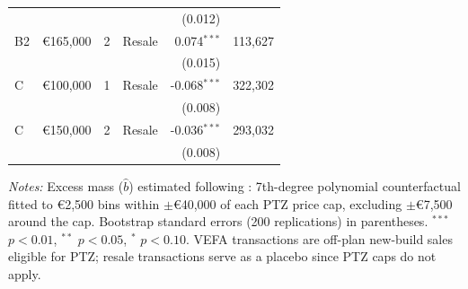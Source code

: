 \begin{table}[H]
\begin{threeparttable}
\begin{tabular}{llccrr}
 & & & & (0.012) & \\
B2 & \euro165,000 & 2 & Resale & 0.074$^{***}$ & 113,627 \\
 & & & & (0.015) & \\
C & \euro100,000 & 1 & Resale & -0.068$^{***}$ & 322,302 \\
 & & & & (0.008) & \\
C & \euro150,000 & 2 & Resale & -0.036$^{***}$ & 293,032 \\
 & & & & (0.008) & \\
\bottomrule
\end{tabular}
\begin{tablenotes}[flushleft]
\small
\item \textit{Notes:} Excess mass ($\hat{b}$) estimated following \citet{kleven2016bunching}: 7th-degree polynomial counterfactual fitted to \euro2,500 bins within $\pm$\euro40,000 of each PTZ price cap, excluding $\pm$\euro7,500 around the cap. Bootstrap standard errors (200 replications) in parentheses. $^{***}$ $p<0.01$, $^{**}$ $p<0.05$, $^{*}$ $p<0.10$. VEFA transactions are off-plan new-build sales eligible for PTZ; resale transactions serve as a placebo since PTZ caps do not apply.
\end{tablenotes}
\end{threeparttable}
\end{table}
